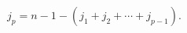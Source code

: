 \begin{equation}
j_{p}=n-1-\left( j_{1}+j_{2}+\cdots +j_{p-1}\right) .  \label{notlong}
\end{equation}

